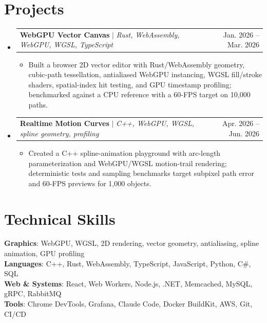\documentclass[letterpaper,11pt]{article}
\makeatletter
\newcommand{\resumeItem}[1]{\item\small{{#1 \vspace{-2pt}}}}
\newcommand{\resumeProjectHeading}[2]{\item\begin{tabular*}{0.97\textwidth}{l@{\extracolsep{\fill}}r}\small#1 & #2 \\\end{tabular*}\vspace{-7pt}}
\newcommand{\resumeSubHeadingListStart}{\begin{itemize}[leftmargin=0.15in, label={}]}
\newcommand{\resumeSubHeadingListEnd}{\end{itemize}}
\newcommand{\resumeItemListStart}{\begin{itemize}}
\newcommand{\resumeItemListEnd}{\end{itemize}\vspace{-5pt}}
\makeatother
\begin{document}
\section{Projects}
\resumeSubHeadingListStart
\resumeProjectHeading
{\textbf{WebGPU Vector Canvas} $|$ \emph{Rust, WebAssembly, WebGPU, WGSL, TypeScript}}{Jan. 2026 -- Mar. 2026}
\resumeItemListStart
\resumeItem{Built a browser 2D vector editor with Rust/WebAssembly geometry, cubic-path tessellation, antialiased WebGPU instancing, WGSL fill/stroke shaders, spatial-index hit testing, and GPU timestamp profiling; benchmarked against a CPU reference with a 60-FPS target on 10,000 paths.}
\resumeItemListEnd
\resumeProjectHeading
{\textbf{Realtime Motion Curves} $|$ \emph{C++, WebGPU, WGSL, spline geometry, profiling}}{Apr. 2026 -- Jun. 2026}
\resumeItemListStart
\resumeItem{Created a C++ spline-animation playground with arc-length parameterization and WebGPU/WGSL motion-trail rendering; deterministic tests and sampling benchmarks target subpixel path error and 60-FPS previews for 1,000 objects.}
\resumeItemListEnd
\resumeSubHeadingListEnd

\section{Technical Skills}
\begin{itemize}[leftmargin=0.15in, label={}]
  \small{\item{
        \textbf{Graphics}{: WebGPU, WGSL, 2D rendering, vector geometry, antialiasing, spline animation, GPU profiling} \\
        \textbf{Languages}{: C++, Rust, WebAssembly, TypeScript, JavaScript, Python, C\#, SQL} \\
        \textbf{Web \& Systems}{: React, Web Workers, Node.js, .NET, Memcached, MySQL, gRPC, RabbitMQ} \\
        \textbf{Tools}{: Chrome DevTools, Grafana, Claude Code, Docker BuildKit, AWS, Git, CI/CD}
        }}
\end{itemize}
\end{document}
